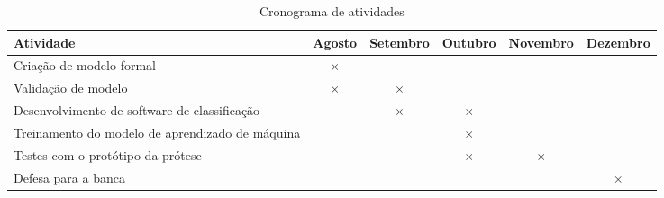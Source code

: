\begin{table}[htbp]
  \centering
  \caption{Cronograma de atividades}
  \label{tab:cronograma}
  \begin{tabularx}{\textwidth}{|X|c|c|c|c|c|}
    \hline
    \textbf{Atividade} & \textbf{Agosto} & \textbf{Setembro} & \textbf{Outubro} & \textbf{Novembro} & \textbf{Dezembro} \\
    \hline
    Criação de modelo formal & \(\times\) & & & & \\
    \hline
    Validação de modelo & \(\times\) & \(\times\)  &  & & \\
    \hline
    Desenvolvimento de software de classificação & & \(\times\) & \(\times\) & & \\
    \hline
    Treinamento do modelo de aprendizado de máquina & & & \(\times\) & &  \\
    \hline
    Testes com o protótipo da prótese & & & \(\times\) & \(\times\) &  \\
    \hline
    Defesa para a banca & & & & & \(\times\)  \\
    \hline
  \end{tabularx}
\end{table}